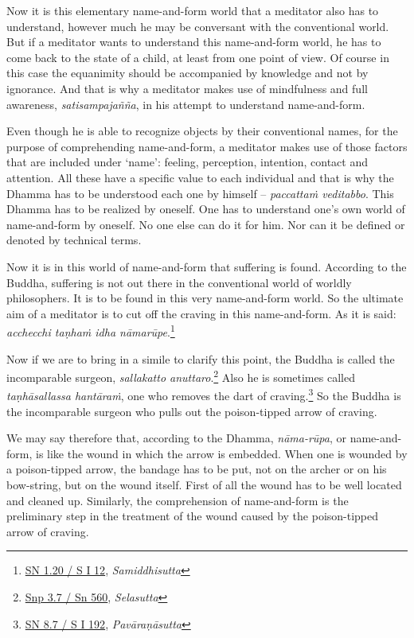 Now it is this elementary name-and-form world that a meditator also has to understand, however much he may be conversant with the conventional world. But if a meditator wants to understand this name-and-form world, he has to come back to the state of a child, at least from one point of view. Of course in this case the equanimity should be accompanied by knowledge and not by ignorance. And that is why a meditator makes use of mindfulness and full awareness, \emph{satisampajañña}, in his attempt to understand name-and-form.

Even though he is able to recognize objects by their conventional names, for the purpose of comprehending name-and-form, a meditator makes use of those factors that are included under `name': feeling, perception, intention, contact and attention. All these have a specific value to each individual and that is why the Dhamma has to be understood each one by himself -- \emph{paccattaṁ veditabbo}. This Dhamma has to be realized by oneself. One has to understand one's own world of name-and-form by oneself. No one else can do it for him. Nor can it be defined or denoted by technical terms.

Now it is in this world of name-and-form that suffering is found. According to the Buddha, suffering is not out there in the conventional world of worldly philosophers. It is to be found in this very name-and-form world. So the ultimate aim of a meditator is to cut off the craving in this name-and-form. As it is said: \emph{acchecchi taṇhaṁ idha nāmarūpe}.\footnote{\href{https://suttacentral.net/sn1.20/pli/ms}{SN 1.20 / S I 12}, \emph{Samiddhisutta}}

Now if we are to bring in a simile to clarify this point, the Buddha is called the incomparable surgeon, \emph{sallakatto anuttaro}.\footnote{\href{https://suttacentral.net/snp3.7/pli/ms}{Snp 3.7 / Sn 560}, \emph{Selasutta}} Also he is sometimes called \emph{taṇhāsallassa hantāraṁ}, one who removes the dart of craving.\footnote{\href{https://suttacentral.net/sn8.7/pli/ms}{SN 8.7 / S I 192}, \emph{Pavāraṇāsutta}} So the Buddha is the incomparable surgeon who pulls out the poison-tipped arrow of craving.

We may say therefore that, according to the Dhamma, \emph{nāma-rūpa}, or name-and-form, is like the wound in which the arrow is embedded. When one is wounded by a poison-tipped arrow, the bandage has to be put, not on the archer or on his bow-string, but on the wound itself. First of all the wound has to be well located and cleaned up. Similarly, the comprehension of name-and-form is the preliminary step in the treatment of the wound caused by the poison-tipped arrow of craving.

